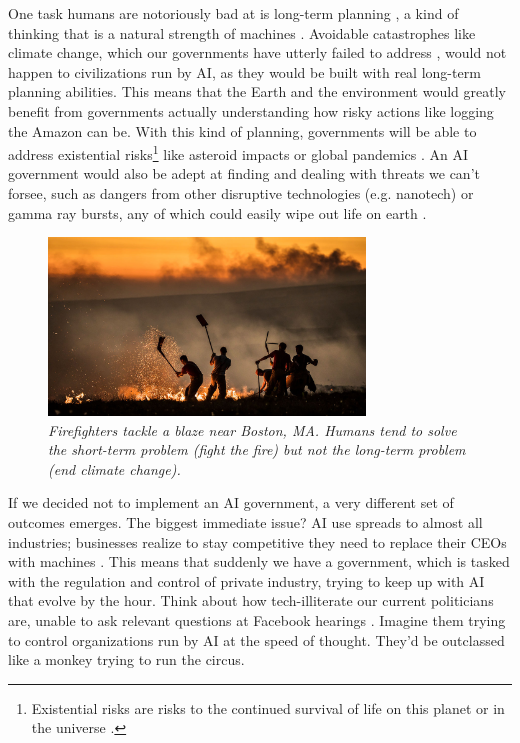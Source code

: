 \documentclass[12pt]{article}
\newenvironment{quote_1in}%
  {\list{}{\leftmargin=1in\rightmargin=1in}\item[]}%
  {\endlist}
\begin{document}
One task humans are notoriously bad at is long-term planning \cite{dorner1994errors}, a kind of thinking that is a natural strength of machines \cite{bostrom2003ethical}. Avoidable catastrophes like climate change, which our governments have utterly failed to address \cite{ghosh2018great}, would not happen to civilizations run by AI, as they would be built with real long-term planning abilities. This means that the Earth and the environment would greatly benefit from governments actually understanding how risky actions like logging the Amazon can be. With this kind of planning, governments will be able to address existential risks\footnote{Existential risks are risks to the continued survival of life on this planet or in the universe \cite{bostrom2011global}.} like asteroid impacts or global pandemics \cite{bostrom2011global}. An AI government would also be adept at finding and dealing with threats we can't forsee, such as dangers from other disruptive technologies (e.g. nanotech) or gamma ray bursts, any of which could easily wipe out life on earth \cite{bostrom2011global}.

\begin{figure}[t!]
\bigskip
\centering
\includegraphics[width=0.75\textwidth]{fire.jpg}
\begin{quote_1in}
    \caption{
    \textit{Firefighters tackle a blaze near Boston, MA. Humans tend to solve the short-term problem (fight the fire) but not the long-term problem (end climate change).} \cite{fire}}
\end{quote_1in}
\end{figure}

If we decided not to implement an AI government, a very different set of outcomes emerges. The biggest immediate issue? AI use spreads to almost all industries; businesses realize to stay competitive they need to replace their CEOs with machines \cite{bostrom2014superintelligence}. This means that suddenly we have a government, which is tasked with the regulation and control of private industry, trying to keep up with AI that evolve by the hour. Think about how tech-illiterate our current politicians are, unable to ask relevant questions at Facebook hearings \cite{rampell2018internet}. Imagine them trying to control organizations run by AI at the speed of thought. They'd be outclassed like a monkey trying to run the circus.
\end{document}
